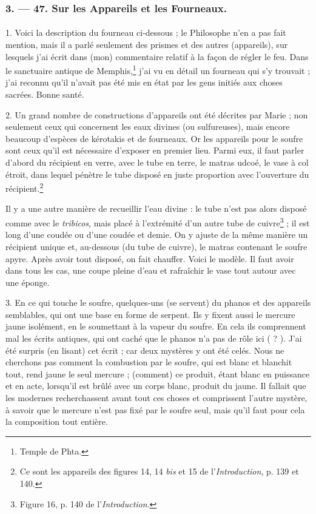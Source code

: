 \documentclass[landscape, a4paper, 11pt, oneside, polutonikogreek, french]{article}
\begin{document}
\bigskip
\centerline{\EightStarTaper}
\centerline{\EightStarTaper\EightStarTaper}
\bigskip

\subsubsection{3. --- 47. Sur les Appareils et les Fourneaux.}
\paragraph{}
1. Voici la description du fourneau ci-dessous ; le Philosophe n'en a pas fait mention, mais il a parlé seulement des prismes et des autres (appareils), sur lesquels j'ai écrit dans (mon) commentaire relatif à la façon de régler le feu. Dans le sanctuaire antique de Memphis,\footnote{Temple de Phta.} j'ai vu en détail un fourneau qui s'y trouvait ; j'ai reconnu qu'il n'avait pas été mis en état par les gens initiés aux choses sacrées. Bonne santé.

2. Un grand nombre de constructions d'appareils ont été décrites par Marie ; non seulement ceux qui concernent les eaux divines (ou sulfureuses), mais encore beaucoup d'espèces de kérotakis et de fourneaux. Or les appareils pour le soufre sont ceux qu'il est nécessaire d'exposer en premier lieu. Parmi eux, il faut parler d'abord du récipient en verre, avec le tube en terre, le matras udcoé, le vase à col étroit, dans lequel pénètre le tube disposé en juste proportion avec l'ouverture du récipient.\footnote{Ce sont les appareils des figures 14, 14 \emph{bis} et 15 de l'\emph{Introduction}, p. 139 et 140.}

Il y a une autre manière de recueillir l'eau divine : le tube n'est pas alors disposé comme avec le \emph{tribicos}, mais placé à l'extrémité d'un autre tube de cuivre\footnote{Figure 16, p. 140 de l'\emph{Introduction}.} ; il est long d'une coudée ou d'une coudée et demie. On y ajuste de la même manière un récipient unique et, au-dessous (du tube de cuivre), le matras contenant le soufre apyre. Après avoir tout disposé, on fait chauffer. Voici le modèle. Il faut avoir dans tous les cas, une coupe pleine d'eau et rafraîchir le vase tout autour avec une éponge.

3. En ce qui touche le soufre, quelques-uns (se servent) du phanos et des appareils semblables, qui ont une base en forme de serpent. Ils y fixent aussi le mercure jaune isolément, en le soumettant à la vapeur du soufre. En cela ils comprennent mal les écrits antiques, qui ont caché que le phanos n'a pas de rôle ici ( ? ). J'ai été surpris (en lisant) cet écrit ; car deux mystères y ont été celés. Nous ne cherchons pas comment la combustion par le soufre, qui est blanc et blanchit tout, rend jaune le seul mercure ; (comment) ce produit, étant blanc en puissance et en acte, lorsqu'il est brûlé avec un corps blanc, produit du jaune. Il fallait que les modernes recherchassent avant tout ces choses et comprissent l'autre mystère, à savoir que le mercure n'est pas fixé par le soufre seul, mais qu'il faut pour cela la composition tout entière.
\end{document}
